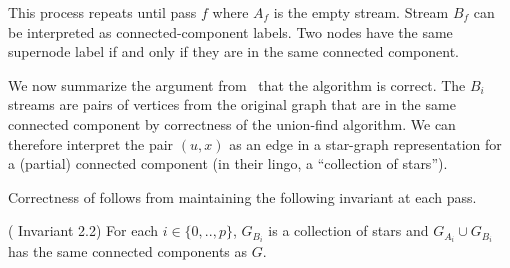 \iffalse
\cite{AMP:demetrescu2009trading} names the \uf structures that 
exist before the $i$'th pass $G_{B_{i-1}}$, as the the representative
relationships can be interpreted as graph edges.  Although these edges
may not be original input edges, they give rise to the same connected component
structure as that of the original stream.
In Figure~\ref{fig:wstream-example}, $G_{B_1}$ has the four edges colored blue.  Note that $G_{B_0}$ is
always the empty graph.


\Cindy{Have to describe processing the rest of the stream, which creates the A stream and the start of the B stream.  I think it would help to have figures here, e.g. the ones from our talks.} 

After all edges of the stream have been processed, the processor outputs (node, leader) pairs for each node in a contracted component, based on the updated state of the \uf structures.
\fi

This process repeats until pass $f$ where $A_f$ is the empty stream. Stream $B_f$ can be interpreted as connected-component labels.  Two nodes have the same supernode label if and only if they are in the same connected component. 



We now summarize the argument from~\cite{AMP:demetrescu2009trading} that the \DFR algorithm is correct.  The $B_i$ streams are pairs of vertices from the original graph that are in the same connected component by correctness of the union-find algorithm.  We can therefore interpret the pair $(u,x)$ as an edge in a star-graph representation for a (partial) connected component (in their lingo, 
a ``collection of stars'').

Correctness of \DFR follows from maintaining the following invariant at each pass.
\begin{invariant} (\cite{AMP:demetrescu2009trading} Invariant 2.2)\label{inv:wstreamreqs}
For each $i \in \{0,..,p\}$, $G_{B_i}$ is a collection of stars and $G_{A_i} \cup G_{B_i}$ has the same connected components as $G$.
\end{invariant}

